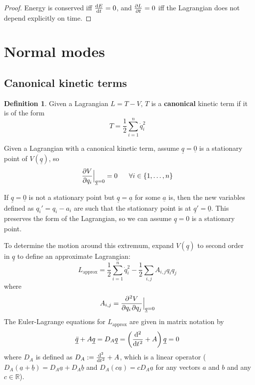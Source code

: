 \documentclass[12pt,a4paper]{article}
\theoremstyle{definition}
\newtheorem{definition}{Definition}[subsection]
\let\oldforall\forall
\renewcommand{\forall}{\ \oldforall}
\begin{document}
\begin{proof}
	Energy is conserved iff $\diff{E}{t} = 0$, and $\diffp{L}{t} = 0$ iff the Lagrangian does not depend explicitly on time.
\end{proof}

\section{Normal modes}

\subsection{Canonical kinetic terms}

\begin{definition}
	Given a Lagrangian $L = T - V$, $T$ is a \textbf{canonical} kinetic term if it is of the form
	\[
		T = \frac{1}{2} \sum_{i = 1}^{n} \dot{q}_i^2
	\]
\end{definition}

Given a Lagrangian with a canonical kinetic term, assume $\underline{q} = \underline{0}$ is a stationary point of $V(\underline{q})$, so
\[
	\diffp{V}{q_i} \Big|_{\underline{q} = 0} = 0 \quad \forall i \in \{ 1, \dots, n \}
\]

If $\underline{q} = \underline{0}$ is not a stationary point but $\underline{q} = \underline{a}$ for some $\underline{a}$ is, then the new variables defined as $q_i' = q_i - a_i$ are such that the stationary point is at $\underline{q}' = \underline{0}$. This preserves the form of the Lagrangian, so we can assume $\underline{q} = 0$ is a stationary point.

To determine the motion around this extremum, expand $V(\underline{q})$ to second order in $\underline{q}$ to define an approximate Lagrangian:
\[
	L_{\text{approx}} = \frac{1}{2} \sum_{i = 1}^{n} \dot{q}_i^2 - \frac{1}{2} \sum_{i, j} A_{i, j} q_i q_j
\]
where
\[
	A_{i, j} = \diffp[1, 1]V{q_i, q_j} \Big|_{\underline{q} = 0}
\]
The Euler-Lagrange equations for $L_{\text{approx}}$ are given in matrix notation by
\[
	\underline{\ddot{q}} + A \underline{q} = D_A \underline{q} = \left( \diff[2]{}{t} + A \right) \underline{q} = 0
\]
where $D_A$ is defined as $D_A := \diff[2]{}{t} + A$, which is a linear operator ($D_A (\underline{a} + \underline{b}) = D_A \underline{a} + D_A \underline{b}$ and $D_A (c \underline{a}) = c D_A \underline{a}$ for any vectors $a$ and $b$ and any $c \in \mathbb{R}$).
\end{document}
